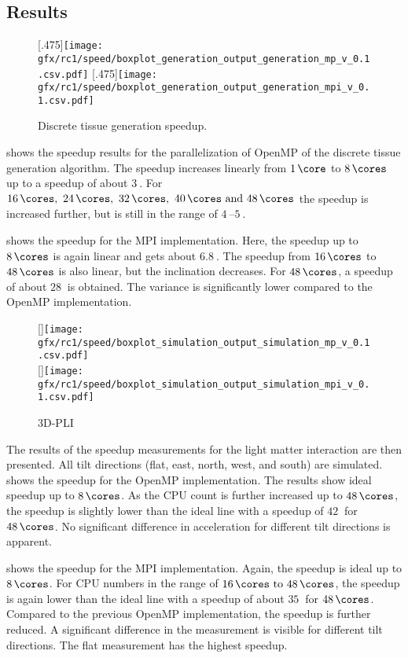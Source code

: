\subsection{Results}
% 
\begin{figure}[!t]
\centering
{}[.475\textwidth]{\texttt{[image: gfx/rc1/speed/boxplot\_generation\_output\_generation\_mp\_v\_0.1.csv.pdf]}}
\hfill
{}[.475\textwidth]{\texttt{[image: gfx/rc1/speed/boxplot\_generation\_output\_generation\_mpi\_v\_0.1.csv.pdf]}}
\caption{Discrete tissue generation speedup.}
\end{figure}
%
 shows the speedup results for the parallelization of \ac{OpenMP} of the discrete tissue generation algorithm.
The speedup increases linearly from $\SI{1}{\core}$ to $\SI{8}{\cores}$ up to a speedup of about $\SI{3}{}$.
For $\SIlist{16;24;32;40;48}{\cores}$ the speedup is increased further, but is still in the range of $\SIrange{4}{5}{}$.
\par
% 
 shows the speedup for the \ac{MPI} implementation.
Here, the speedup up to $\SI{8}{\cores}$ is again linear and gets about $\SI{6.8}{}$.
The speedup from $\SI{16}{\cores}$ to $\SI{48}{\cores}$ is also linear, but the inclination decreases.
For $\SI{48}{\cores}$, a speedup of about $\SI{28}{}$ is obtained.
The variance is significantly lower compared to the \ac{OpenMP} implementation.
\par
% 
\begin{figure}[!t]
\centering
{}[\textwidth]{\texttt{[image: gfx/rc1/speed/boxplot\_simulation\_output\_simulation\_mp\_v\_0.1.csv.pdf]}}
\\
[\textwidth]{\texttt{[image: gfx/rc1/speed/boxplot\_simulation\_output\_simulation\_mpi\_v\_0.1.csv.pdf]}}
\caption{\ac{3D-PLI}}
\end{figure}
%
The results of the speedup measurements for the light matter interaction are then presented.
All tilt directions (flat, east, north, west, and south) are simulated.
 shows the speedup for the \ac{OpenMP} implementation.
The results show ideal speedup up to $\SI{8}{\cores}$.
As the \ac{CPU} count is further increased up to $\SI{48}{\cores}$, the speedup is slightly lower than the ideal line with a speedup of $\SI{42}{}$ for $\SI{48}{\cores}$.
No significant difference in acceleration for different tilt directions is apparent.
\par
% 
 shows the speedup for the \ac{MPI} implementation.
Again, the speedup is ideal up to $\SI{8}{\cores}$.
For \ac{CPU} numbers in the range of $\SIrange{16}{48}{\cores}$, the speedup is again lower than the ideal line with a speedup of about $\SI{35}{}$ for $\SI{48}{\cores}$.
Compared to the previous \ac{OpenMP} implementation, the speedup is further reduced.
A significant difference in the measurement is visible for different tilt directions.
The flat measurement has the highest speedup.
%
%
%
